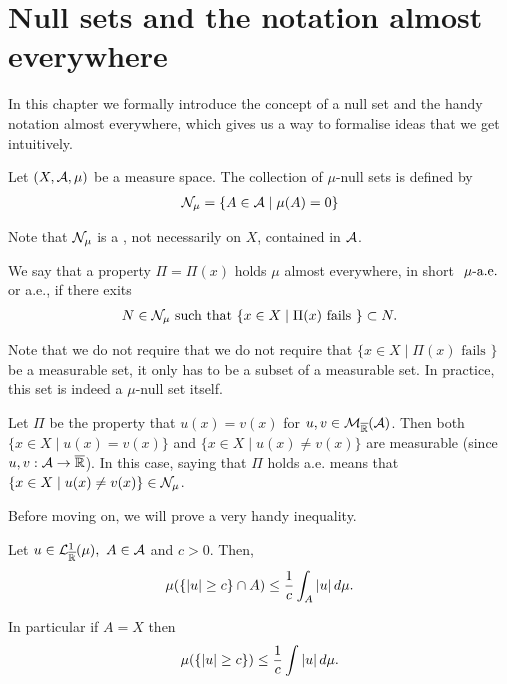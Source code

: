 
\chapter{Null sets and the notation almost everywhere}

In this chapter we formally introduce the concept of a null set and the handy notation almost everywhere, which gives us a way to formalise ideas that we get intuitively.

\begin{dfn}
	\label{dfn:mu-null-set}
	Let $(X, \mathcal{A}, \mu)$ be a measure space. The collection of $\mu$-null sets is defined by
	\begin{align}
		\mathcal{N}_\mu = \left\{ A \in \mathcal{A} \mid \mu(A) = 0 \right\}
	\end{align}
\end{dfn}

Note that $\mathcal{N}_\mu$ is a \siga, not necessarily on $X$, contained in $\mathcal{A}$.

\begin{dfn}
	\label{dfn:almost-everyhere}
	We say that a property $\Pi = \Pi(x)$ holds $\mu$ almost everywhere, in short $\ \mu\text{-a.e. }$ or a.e., if there exits
	\begin{align}
		N \in \mathcal{N}_\mu \text{ such that } \{x \in X \mid \Pi(x) \text{ fails }\} \subset N.
	\end{align}
\end{dfn}

Note that we do not require that we do not require that $\{x \in X \mid \Pi(x) \text{ fails }\}$ be a measurable set, it only has to be a subset of a measurable set. In practice, this set is indeed a $\mu$-null set itself.

\begin{eg}
	Let $\Pi$ be the property that $u(x) = v(x)$ for $u, v \in \mathcal{M}_{\overline{\mathbb{R}}}(\mathcal{A})$. Then both $\{x \in X \mid u(x) = v(x)\}$ and $\{x \in X \mid u(x) \neq v(x)\}$ are measurable (since $u, v : \mathcal{A} \to {\overline{\mathbb{R}}}$). In this case, saying that $\Pi$ holds a.e. means that $\{x \in X \mid u(x) \neq v(x)\} \in \mathcal{N}_\mu$.
\end{eg}

Before moving on, we will prove a very handy inequality.

\begin{thm}
	\label{thm:markov-inequality}
	Let $u \in \mathcal{L}_{\overline{\mathbb{R}}}^1(\mu),\ A \in \mathcal{A}$ and $c > 0$. Then,
	\begin{align}
		\mu(\{\left\vert{u}\right\vert \geq c\} \cap A) \leq \frac{1}{c} \int_A \left\vert{u}\right\vert d\mu.
	\end{align}
	
	In particular if $A = X$ then
	\begin{align*}
		\mu(\{\left\vert{u}\right\vert \geq c\}) \leq \frac{1}{c} \int \left\vert{u}\right\vert d\mu.
	\end{align*}
\end{thm}

